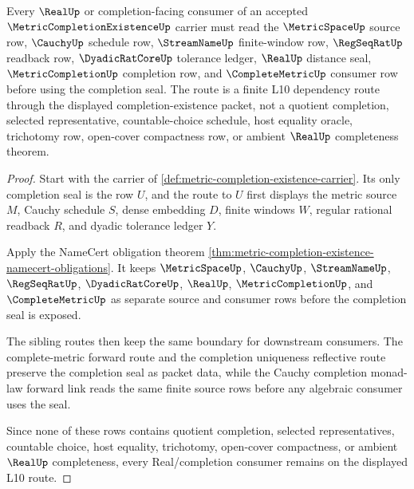 \begin{theorem}
\label{thm:metric-completion-existence-orphan-real-route}
Every $\RealUp$ or completion-facing consumer of an accepted $\MetricCompletionExistenceUp$ carrier must read the $\MetricSpaceUp$ source row, $\CauchyUp$ schedule row, $\StreamNameUp$ finite-window row, $\RegSeqRatUp$ readback row, $\DyadicRatCoreUp$ tolerance ledger, $\RealUp$ distance seal, $\MetricCompletionUp$ completion row, and $\CompleteMetricUp$ consumer row before using the completion seal. The route is a finite L10 dependency route through the displayed completion-existence packet, not a quotient completion, selected representative, countable-choice schedule, host equality oracle, trichotomy row, open-cover compactness row, or ambient $\RealUp$ completeness theorem.
\end{theorem}
\begin{proof}
Start with the carrier of \autoref{def:metric-completion-existence-carrier}. Its only completion seal is the row $U$, and the route to $U$ first displays the metric source $M$, Cauchy schedule $S$, dense embedding $D$, finite windows $W$, regular rational readback $R$, and dyadic tolerance ledger $Y$.

Apply the NameCert obligation theorem \autoref{thm:metric-completion-existence-namecert-obligations}. It keeps $\MetricSpaceUp$, $\CauchyUp$, $\StreamNameUp$, $\RegSeqRatUp$, $\DyadicRatCoreUp$, $\RealUp$, $\MetricCompletionUp$, and $\CompleteMetricUp$ as separate source and consumer rows before the completion seal is exposed.

The sibling routes then keep the same boundary for downstream consumers. The complete-metric forward route and the completion uniqueness reflective route preserve the completion seal as packet data, while the Cauchy completion monad-law forward link reads the same finite source rows before any algebraic consumer uses the seal.

Since none of these rows contains quotient completion, selected representatives, countable choice, host equality, trichotomy, open-cover compactness, or ambient $\RealUp$ completeness, every Real/completion consumer remains on the displayed L10 route.
\end{proof}
